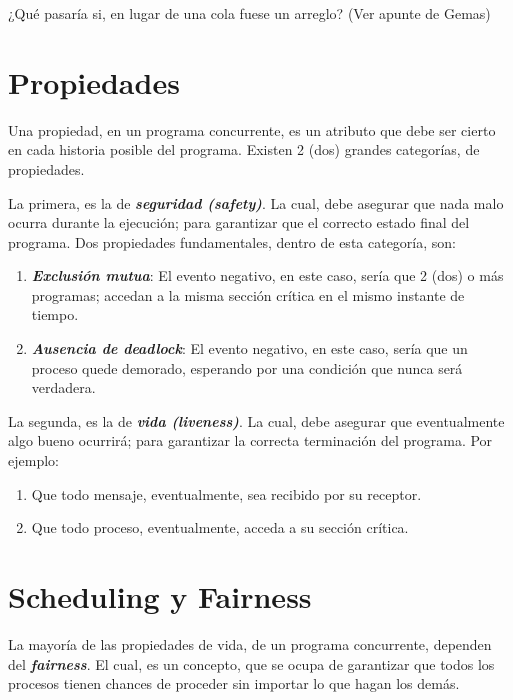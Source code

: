 \documentclass[a4paper, 10pt]{report}
\begin{document}
\begin{basic_box}
     ¿Qué pasaría si, en lugar de una cola fuese un arreglo? (Ver apunte de Gemas)
\end{basic_box}

\section{Propiedades}

Una propiedad, en un programa concurrente, es un atributo que debe ser cierto en cada historia posible del programa. Existen 2 (dos) grandes categorías, de propiedades.

La primera, es la de \textbf{\emph{seguridad (safety)}}. La cual, debe asegurar que nada malo ocurra durante la ejecución; para garantizar que el correcto estado final del programa. Dos propiedades fundamentales, dentro de esta categoría, son:

\begin{enumerate}
    \item \textbf{\emph{Exclusión mutua}}: El evento negativo, en este caso, sería que 2 (dos) o más programas; accedan a la misma sección crítica en el mismo instante de tiempo.
    \item \textbf{\emph{Ausencia de deadlock}}: El evento negativo, en este caso, sería que un proceso quede demorado, esperando por una condición que nunca será verdadera. 
\end{enumerate}

La segunda, es la de \textbf{\emph{vida (liveness)}}. La cual, debe asegurar que eventualmente algo bueno ocurrirá; para garantizar la correcta terminación del programa. Por ejemplo:

\begin{enumerate}
    \item Que todo mensaje, eventualmente, sea recibido por su receptor.
    \item Que todo proceso, eventualmente, acceda a su sección crítica.
\end{enumerate}

\section{Scheduling y Fairness}

La mayoría de las propiedades de vida, de un programa concurrente, dependen del \textbf{\emph{fairness}}. El cual, es un concepto, que se ocupa de garantizar que todos los procesos tienen chances de proceder sin importar lo que hagan los demás.
\end{document}
